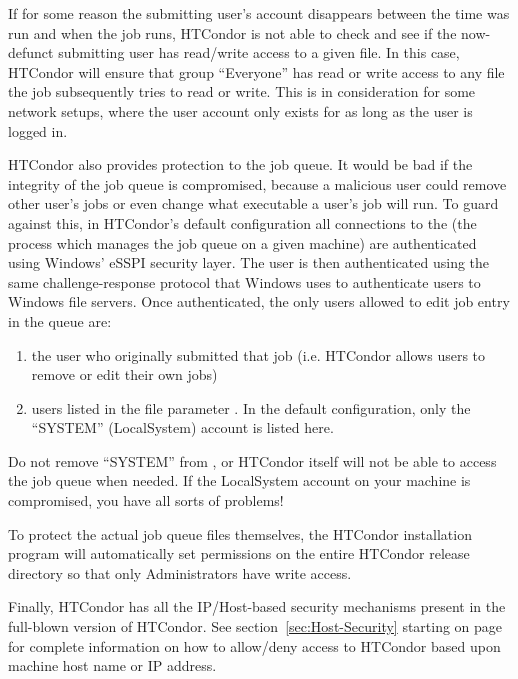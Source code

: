 If for some reason the submitting user's account disappears between the time
 was run and when the job runs, HTCondor is not able to check
and see if the now-defunct submitting user has read/write access to a given
file.  In this case, HTCondor will ensure that group ``Everyone'' has read or
write access to any file the job subsequently tries to read or write.  This
is in consideration for some network setups, where the user account only
exists for as long as the user is logged in.

HTCondor also provides protection to the job queue.  It would be bad if the
integrity of the job queue is compromised, because a malicious user could
remove other user's jobs or even change what executable a user's job will
run.  To guard against this, in HTCondor's default configuration all connections to the  (the
process which manages the job queue on a given machine) are authenticated
using Windows' eSSPI security layer.  The user is then authenticated
using the same challenge-response protocol that Windows uses to authenticate
users to Windows file servers.  Once authenticated, the only users
allowed to edit job entry in the queue are:
\begin{enumerate}
\item the user who originally submitted that job (i.e. HTCondor allows users
to remove or edit their own jobs)
\item users listed in the  file parameter
.  In the default configuration, only the
``SYSTEM'' (LocalSystem) account is listed here.  
\end{enumerate}
\Warn Do not remove ``SYSTEM'' from , or
HTCondor itself will not be able to access the job queue when needed.  If the
LocalSystem account on your machine is compromised, you have all sorts of
problems!

To protect the actual job queue files themselves, the HTCondor installation
program will automatically set permissions on the entire HTCondor release
directory so that only Administrators have write access.

Finally, HTCondor has all the IP/Host-based security mechanisms present
in the full-blown version of HTCondor.  See section~\ref{sec:Host-Security}
starting on page~\pageref{sec:Host-Security} for complete information
on how to allow/deny access to HTCondor based upon machine host name or
IP address.


